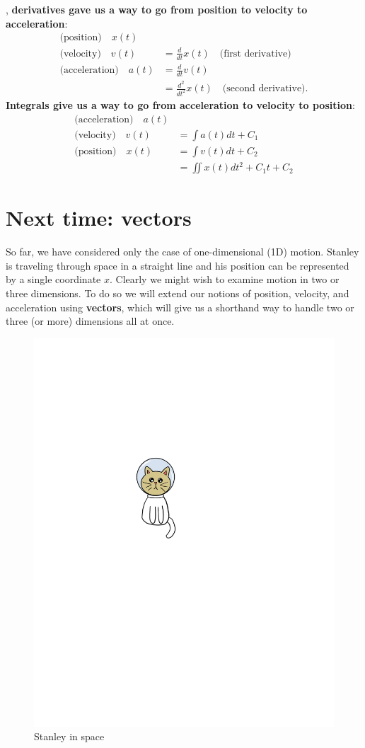 \documentclass{tufte-handout}
\begin{document}
, \textbf{derivatives gave us a way to go from position to velocity to acceleration}:
\begin{align}
\text{(position)}\quad x(t) & \\
\text{(velocity)}\quad v(t) &= \frac{d}{dt} x(t)\quad\text{(first derivative)} \\
\text{(acceleration)}\quad a(t) &= \frac{d}{dt} v(t) \\
&= \frac{d^2}{dt^2} x(t)\quad\text{(second derivative)}.
\end{align}
\textbf{Integrals give us a way to go from acceleration to velocity to position}:
\begin{align}
\text{(acceleration)}\quad a(t) & \\
\text{(velocity)}\quad v(t) &= \int a(t) dt + C_1 \\
\text{(position)}\quad x(t) &= \int v(t) dt + C_2 \\
&= \iint x(t) dt^2 + C_1 t + C_2 
\end{align}




\section{Next time: vectors}
So far, we have considered only the case of one-dimensional (1D) motion. Stanley is traveling through space in a straight line and his position can be represented by a single coordinate $x$. Clearly we might wish to examine motion in two or three dimensions. To do so we will extend our notions of position, velocity, and acceleration using \textbf{vectors}, which will give us a shorthand way to handle two or three (or more) dimensions all at once. 


\begin{figure}[h]
\begin{center}
\includegraphics[width=\columnwidth]{stanley1.jpg}
\end{center}
\caption{Stanley in space}
\end{figure}
\end{document}
